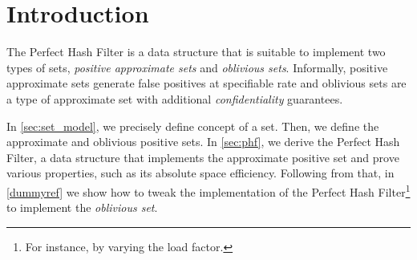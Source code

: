 \documentclass[ ../main.tex]{subfiles}
\begin{document}
\section{Introduction}
The Perfect Hash Filter is a data structure that is suitable to implement two types of sets, \emph{positive approximate sets}\cite{aset} and \emph{oblivious sets}\cite{obset}.
Informally, positive approximate sets generate false positives at specifiable rate and oblivious sets are a type of approximate set with additional \emph{confidentiality} guarantees.

In \cref{sec:set_model}, we precisely define concept of a set.
Then, we define the approximate and oblivious positive sets.
In \cref{sec:phf}, we derive the Perfect Hash Filter, a data structure that implements the approximate positive set and prove various properties, such as its absolute space efficiency.
Following from that, in \cref{dummyref} we show how to tweak the implementation of the Perfect Hash Filter\footnote{For instance, by varying the load factor.} to implement the \emph{oblivious set}. 
\end{document}
